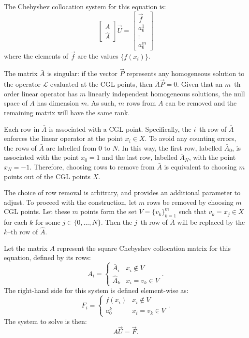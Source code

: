 \documentclass{sfuthesis}
\begin{document}
The Chebyshev collocation system for this equation is:
\begin{equation}
\begin{bmatrix} \bar{A} \\ \hat{A} \end{bmatrix} \vec{U} =
\begin{bmatrix} \vec{f} \\ a_0^1 \\ \vdots \\ a_0^m \end{bmatrix}
\end{equation}
where the elements of $\vec{f}$ are the values $\{ f(x_i) \}$.

The matrix $\bar{A}$ is singular: if the vector $\vec{P}$ represents any homogeneous solution to the operator $\mathcal{L}$ evaluated at the CGL points, then $\bar{A} \vec{P} = 0$.
Given that an $m$--th order linear operator has $m$ linearly independent homogeneous solutions, the null space of $\bar{A}$ has dimension $m$.
As such, $m$ rows from $\bar{A}$ can be removed and the remaining matrix will have the same rank.

Each row in $\bar{A}$ is associated with a CGL point.
Specifically, the $i$--th row of $\bar{A}$ enforces the linear operator at the point $x_i \in X$.
To avoid any counting errors, the rows of $\bar{A}$ are labelled from 0 to $N$.
In this way, the first row, labelled $\bar{A}_0$, is associated with the point $x_0 = 1$ and the last row, labelled $\bar{A}_N$, with the point $x_N = -1$.
Therefore, choosing rows to remove from $\bar{A}$ is equivalent to choosing $m$ points out of the CGL points $X$.

The choice of row removal is arbitrary, and provides an additional parameter to adjust.
To proceed with the construction, let $m$ rows be removed by choosing $m$ CGL points.
Let these $m$ points form the set $V = \{ v_k \}_{k=1}^m$ such that $v_k = x_j \in X$ for each $k$ for some $j \in \{0, ..., N \}$.
Then the $j$--th row of $\bar{A}$ will be replaced by the $k$--th row of $\hat{A}$.

Let the matrix $A$ represent the square Chebyshev collocation matrix for this equation, defined by its rows:
\begin{equation}
A_i = \begin{cases} \bar{A}_i & x_i \notin V \\ \hat{A}_k & x_i = v_k \in V \end{cases}.
\end{equation}
The right-hand side for this system is defined element-wise as:
\begin{equation}
F_i = \begin{cases} f(x_i) & x_i \notin V \\ a_0^k & x_i = v_k \in V \end{cases}.
\end{equation}
The system to solve is then:
\begin{equation} \label{eq:sys1}
A \vec{U} = \vec{F}.
\end{equation}
\end{document}
